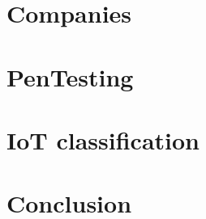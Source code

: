 \documentclass[a4paper,english,11pt]{article}
\begin{document}
	\newpage
	
	\section{Companies}
	\label{sec:empresas}
	
	
	\newpage
	
	\section{PenTesting}
	\label{sec:pentesting}
	
	
	\newpage
	
	\section{IoT classification}
	\label{sec:iot}
	
	
	\newpage
	
	\section{Conclusion}
	\label{sec:artcomp}
	
	
	\newpage
	
\end{document}
